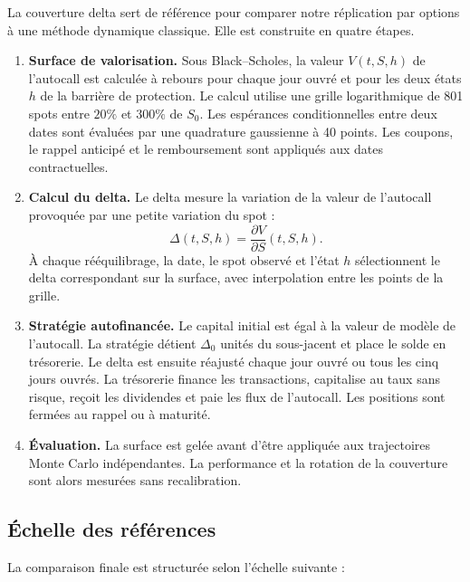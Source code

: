 \documentclass[12pt,a4paper]{article}
\newcommand{\1}{\mathbf{1}}
\begin{document}
La couverture delta sert de référence pour comparer notre réplication par options
à une méthode dynamique classique. Elle est construite en quatre étapes.

\begin{enumerate}
\item \textbf{Surface de valorisation.} Sous Black--Scholes, la valeur
$V(t,S,h)$ de l'autocall est calculée à rebours pour chaque jour ouvré et pour
les deux états $h$ de la barrière de protection. Le calcul utilise une grille
logarithmique de 801 spots entre $20\%$ et $300\%$ de $S_0$. Les espérances
conditionnelles entre deux dates sont évaluées par une quadrature gaussienne à
40 points. Les coupons, le rappel anticipé et le remboursement sont appliqués
aux dates contractuelles.

\item \textbf{Calcul du delta.} Le delta mesure la variation de la valeur de
l'autocall provoquée par une petite variation du spot :
\begin{equation}
  \Delta(t,S,h)=\frac{\partial V}{\partial S}(t,S,h).
\label{eq:delta-benchmark}
\end{equation}
À chaque rééquilibrage, la date, le spot observé et l'état $h$ sélectionnent le
delta correspondant sur la surface, avec interpolation entre les points de la
grille.

\item \textbf{Stratégie autofinancée.} Le capital initial est égal à la valeur
de modèle de l'autocall. La stratégie détient $\Delta_0$ unités du sous-jacent et
place le solde en trésorerie. Le delta est ensuite réajusté chaque jour ouvré ou
tous les cinq jours ouvrés. La trésorerie finance les transactions, capitalise au
taux sans risque, reçoit les dividendes et paie les flux de l'autocall. Les
positions sont fermées au rappel ou à maturité.

\item \textbf{Évaluation.} La surface est gelée avant d'être appliquée aux
trajectoires Monte Carlo indépendantes. La performance et la rotation de la
couverture sont alors mesurées sans recalibration.
\end{enumerate}

\subsection{Échelle des références}

La comparaison finale est structurée selon l'échelle suivante :
\end{document}
